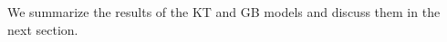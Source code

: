 \documentclass{article}
\begin{document}
We summarize the results of the KT and GB models and discuss them in the next section.

%

%
\end{document}
